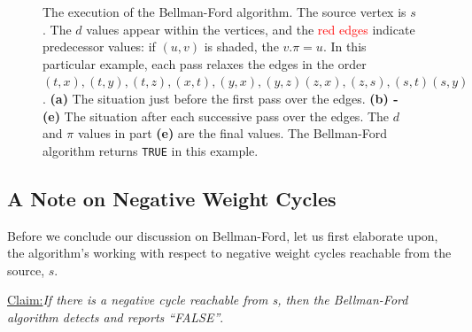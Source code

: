 \documentclass[a4paper, 12pt]{report}
\newenvironment{claim}[1]{\par\noindent\underline{Claim:}\space#1}{}
\theoremstyle{definition}
\begin{document}
\begin{figure}[H]
\begin{subfigure}[t]{0.3\textwidth}
\begin{tikzpicture}[scale=1.15]
    \end{tikzpicture}
    \caption{\text{\hspace{-1cm}}} \label{fig3:e}  
    \end{subfigure}
    \caption{The execution of the Bellman-Ford algorithm. The source vertex is \(s\). The \(d\) values appear within the vertices, and the \textcolor{red}{red edges}
    indicate predecessor values: if \((u, v)\) is shaded, the \(v.\pi = u\). In this particular example, each pass relaxes the edges in the order
    $(t, x), (t, y), (t, z), (x, t), (y, x), (y, z) (z, x), (z, s), (s, t)  (s, y)$. \textbf{(a)} The situation just before the
    first pass over the edges. \textbf{(b) - (e)} The situation after each successive pass over the edges. The \(d\) and $\pi$ values in part \textbf{(e)} are the final values.
    The Bellman-Ford algorithm returns \texttt{TRUE} in this example. \cite{cormenBk}}
\end{figure}

\subsection{A Note on Negative Weight Cycles}
Before we conclude our discussion on Bellman-Ford, let us first elaborate upon, the algorithm's working with respect to negative weight cycles reachable from the source, \(s\).

\begin{claim}
\emph{If there is a negative cycle reachable from s, then the Bellman-Ford algorithm detects and reports
``FALSE”}.
\end{claim}
\end{document}
